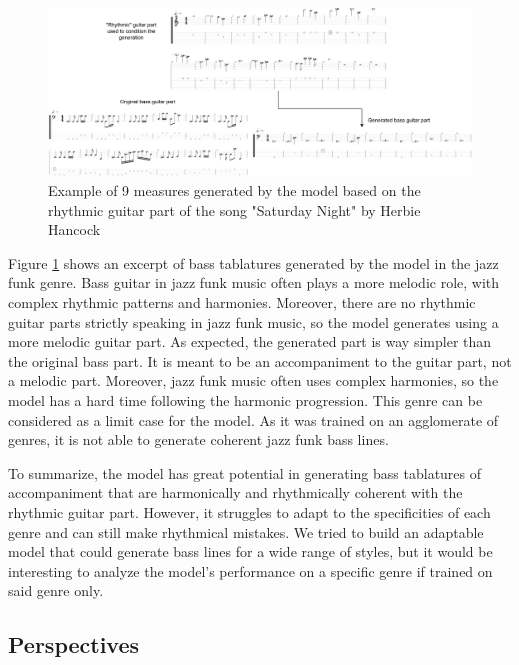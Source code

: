 
\begin{figure}[!ht]
    \centering
    \includegraphics[width=\linewidth]{../images-figures/gen_herbie_hancock.png}
    \caption{Example of 9 measures generated by the model based on the rhythmic guitar part of the song "Saturday Night" by Herbie Hancock}
    \label{fig:gen_herbie_hancock}
\end{figure}

Figure \ref{fig:gen_herbie_hancock} shows an excerpt of bass tablatures generated by the model in the jazz funk genre.
Bass guitar in jazz funk music often plays a more melodic role, with complex rhythmic patterns and harmonies.
Moreover, there are no rhythmic guitar parts strictly speaking in jazz funk music, so the model generates using a more melodic guitar part.
As expected, the generated part is way simpler than the original bass part.
It is meant to be an accompaniment to the guitar part, not a melodic part.
Moreover, jazz funk music often uses complex harmonies, so the model has a hard time following the harmonic progression.
This genre can be considered as a limit case for the model. As it was trained on an agglomerate of genres, it is not able to generate coherent jazz funk bass lines.

To summarize, the model has great potential in generating bass tablatures of accompaniment that are harmonically and rhythmically coherent with the rhythmic guitar part.
However, it struggles to adapt to the specificities of each genre and can still make rhythmical mistakes.
We tried to build an adaptable model that could generate bass lines for a wide range of styles,
but it would be interesting to analyze the model's performance on a specific genre if trained on said genre only.

\subsection{Perspectives}

